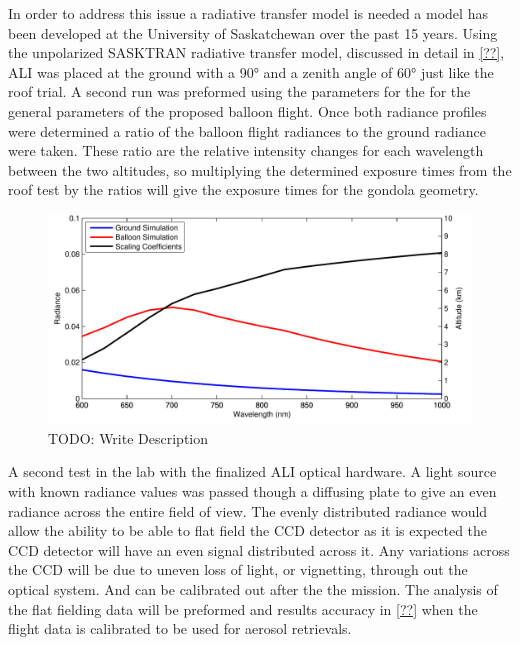 In order to address this issue a radiative transfer model is needed a model has been developed at the University of Saskatchewan over the past 15 years. Using the unpolarized SASKTRAN radiative transfer model, discussed in detail in \autoref{??}, ALI was placed at the ground with a 90\si{\degree} and a zenith angle of 60\si{\degree} just like the roof trial. A second run was preformed using the parameters for the for the general parameters of the proposed balloon flight. Once both radiance profiles were determined a ratio of the balloon flight radiances to the ground radiance were taken. These ratio are the relative intensity changes for each wavelength between the two altitudes, so multiplying the determined exposure times from the roof test by the ratios will give the exposure times for the gondola geometry.

\begin{figure}[h!]
        \centering
        \includegraphics[width=1.0\textwidth]{./Images/3-3-ExposureTimeDetermination.pdf}
        \caption[Flight Exposure Time Determination]{TODO: Write Description}
        \label{fig:3.3:exposureTimeDetermination}
\end{figure}

A second test in the lab with the finalized ALI optical hardware. A light source with known radiance values was passed though a diffusing plate to give an even radiance across the entire field of view. The evenly distributed radiance would allow the ability to be able to flat field the CCD detector as it is expected the CCD detector will have an even signal distributed across it. Any variations across the CCD will be due to uneven loss of light, or vignetting, through out the optical system. And can be calibrated out after the the mission. The analysis of the flat fielding data will be preformed and results accuracy in \autoref{??} when the flight data is calibrated to be used for aerosol retrievals.

